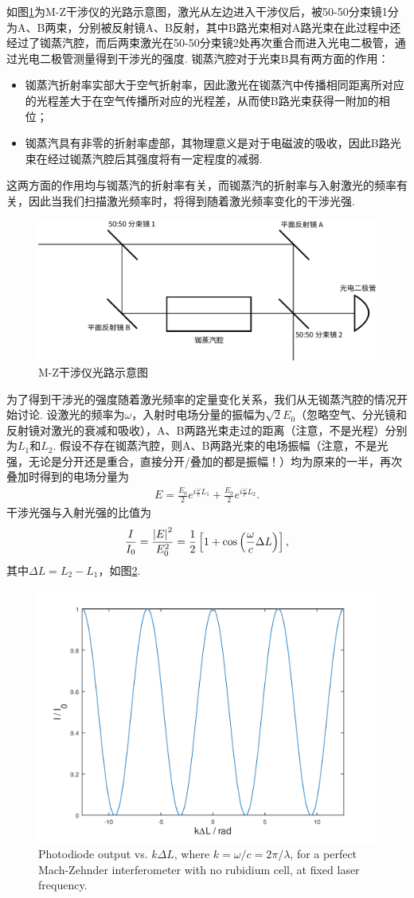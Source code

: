 \documentclass{assignment}
\begin{document}
如图\ref{M-Z}为M-Z干涉仪的光路示意图，激光从左边进入干涉仪后，被50-50分束镜1分为A、B两束，分别被反射镜A、B反射，其中B路光束相对A路光束在此过程中还经过了铷蒸汽腔，而后两束激光在50-50分束镜2处再次重合而进入光电二极管，通过光电二极管测量得到干涉光的强度. 铷蒸汽腔对于光束B具有两方面的作用：
\begin{itemize}
    \item 铷蒸汽折射率实部大于空气折射率，因此激光在铷蒸汽中传播相同距离所对应的光程差大于在空气传播所对应的光程差，从而使B路光束获得一附加的相位；
    \item 铷蒸汽具有非零的折射率虚部，其物理意义是对于电磁波的吸收，因此B路光束在经过铷蒸汽腔后其强度将有一定程度的减弱.
\end{itemize}
这两方面的作用均与铷蒸汽的折射率有关，而铷蒸汽的折射率与入射激光的频率有关，因此当我们扫描激光频率时，将得到随着激光频率变化的干涉光强.
\begin{figure}[h]
    \centering
    \includegraphics[width=.5\textwidth]{M-Z-Interferometer.pdf}
    \caption{M-Z干涉仪光路示意图}
    \label{M-Z}
\end{figure}

为了得到干涉光的强度随着激光频率的定量变化关系，我们从无铷蒸汽腔的情况开始讨论. 设激光的频率为$\omega$，入射时电场分量的振幅为$\sqrt{2}E_0$（忽略空气、分光镜和反射镜对激光的衰减和吸收），A、B两路光束走过的距离（注意，不是光程）分别为$L_1$和$L_2$. 假设不存在铷蒸汽腔，则A、B两路光束的电场振幅（注意，不是光强，无论是分开还是重合，直接分开/叠加的都是振幅！）均为原来的一半，再次叠加时得到的电场分量为
\begin{align}
    E=\frac{E_0}{2}e^{i\frac{\omega}{c}L_1}+\frac{E_0}{2}e^{i\frac{\omega}{c}L_2}.
\end{align}
干涉光强与入射光强的比值为
\begin{align}
    \label{I/I_0-without-cell}
    \frac{I}{I_0}=\frac{\left\lvert E\right\rvert^2}{E_0^2}=\frac{1}{2}\left[1+\cos\left(\frac{\omega}{c}\Delta L\right)\right],
\end{align}
其中$\Delta L=L_2-L_1$，如图\ref{OutputWithoutRbCell}.
\begin{figure}[h]
    \centering
    \includegraphics[width=.5\textwidth]{OutputWithoutCell.png}
    \caption{Photodiode output vs. $k\Delta L$, where $k=\omega/c=2\pi/\lambda$, for a perfect Mach-Zehnder interferometer with no rubidium cell, at fixed laser frequency.}
        \label{OutputWithoutRbCell}
\end{figure}
\end{document}
